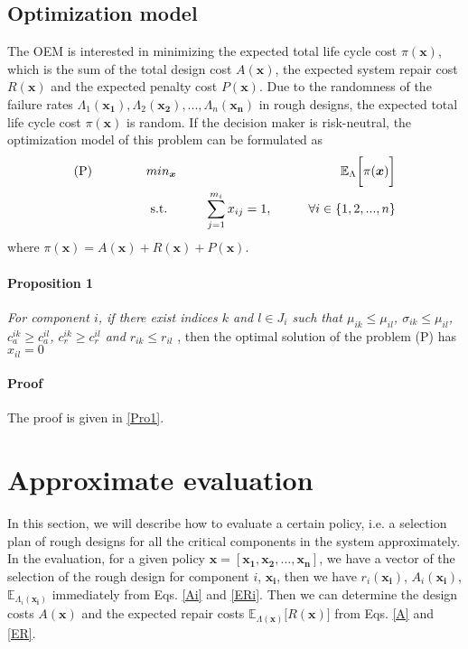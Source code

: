 \documentclass[preprint,12pt]{elsarticle}
\begin{document}
\subsection{Optimization model}
The OEM is interested in minimizing the expected total life cycle cost $\pi(\boldsymbol{x})$, which is the sum of the total design cost $A(\boldsymbol{x})$, the expected system repair cost $R(\boldsymbol{x})$ and the expected penalty cost $P(\boldsymbol{x})$. Due to the randomness of the failure rates $\Lambda_{1}(\boldsymbol{x_{1}}),\Lambda_{2}(\boldsymbol{x_{2}}),...,\Lambda_{n}(\boldsymbol{x_{n}})$ in rough designs, the expected total life cycle cost $\pi(\boldsymbol{x})$ is random. If the decision maker is risk-neutral, the optimization model of this problem can be formulated as
\begin{eqnarray}
\text{(P)} \hspace{15mm} & min_{\boldsymbol{x}} & \hspace{10mm} \mathbb{E}_{\Lambda} \bigg[ \pi(\boldsymbol{x})\bigg] \nonumber\\
& \text{ s.t. }&  \hspace{5mm} \sum_{j=1}^{m_i}{x_{ij}}=1, \hspace{10mm} \forall i \in \{1,2,...,n\} \nonumber
\end{eqnarray}
where $\pi(\boldsymbol{x})=A(\boldsymbol{x})+R(\boldsymbol{x})+P(\boldsymbol{x})$.

\paragraph{\textbf{Proposition 1}} \textit{For component $i$, if there exist indices $k$ and $l\in J_{i}$ such that $\mu_{ik}\leq \mu_{il}$, $\sigma_{ik}\leq \mu_{il}$, $c^{ik}_{a}\geq c^{il}_{a} $, $c^{ik}_{r}\geq c^{il}_{r} $ and $r_{ik} \leq r_{il}$ },  then the optimal solution of the problem (P) has $x_{il}=0$

\paragraph{\textbf{Proof}} The proof is given in \ref{Pro1}.


\section{Approximate evaluation}

In this section, we will describe how to evaluate a certain policy, i.e. a selection plan of rough designs for all the critical components in the system approximately. In the evaluation, for a given policy $\boldsymbol{x}=[\boldsymbol{x_{1}},\boldsymbol{x_{2}},\dots,\boldsymbol{x_{n}}]$, we have a vector of the selection of the rough design for component $i$, $\boldsymbol{x_{i}}$, then we have $r_{i}(\boldsymbol{x_{i}})$, $A_{i}(\boldsymbol{x_{i}})$, $\mathbb{E}_{\Lambda_{i}(\boldsymbol{x_{i}})}$ immediately from Eqs. \eqref{Ai} and \eqref{ERi}. Then we can determine the design costs $A(\boldsymbol{x})$ and the expected repair costs $\mathbb{E}_{\Lambda(\boldsymbol{x})} \bigg[ R(\boldsymbol{x}) \bigg]$ from Eqs. \eqref{A} and \eqref{ER}.
\end{document}
